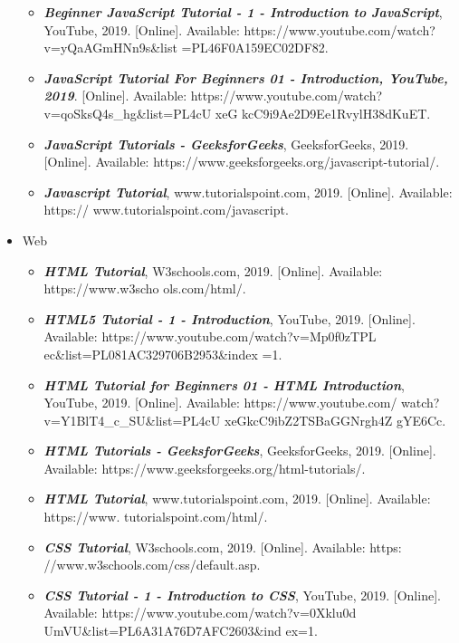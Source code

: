 \documentclass[12pt, a4paper]{report}
\begin{document}
\begin{itemize}
\begin{itemize}
    \item \textit{\textbf{Beginner JavaScript Tutorial - 1 - Introduction to JavaScript}}, YouTube, 2019. [Online]. Available: https://www.youtube.com/watch?v=yQaAGmHNn9s&list =PL46F0A159EC02DF82. 

    \item \textit{\textbf{JavaScript Tutorial For Beginners 01 - Introduction, YouTube, 2019}}. [Online]. Available: https://www.youtube.com/watch?v=qoSksQ4s{\_}hg&list=PL4cU xeG kcC9i9Ae2D9Ee1RvylH38dKuET.

    \item \textit{\textbf{JavaScript Tutorials - GeeksforGeeks}}, GeeksforGeeks, 2019. [Online]. Available: https://www.geeksforgeeks.org/javascript-tutorial/. 

    \item \textit{\textbf{Javascript Tutorial}}, www.tutorialspoint.com, 2019. [Online]. Available: https:// www.tutorialspoint.com/javascript.
    \end{itemize}
    \item Web
        \begin{itemize}
    \item \textit{\textbf{HTML Tutorial}}, W3schools.com, 2019. [Online]. Available: https://www.w3scho ols.com/html/. 
    
    \item \textit{\textbf{HTML5 Tutorial - 1 - Introduction}}, YouTube, 2019. [Online]. Available: https://www.youtube.com/watch?v=Mp0f0zTPL ec&list=PL081AC329706B2953&index =1. 
    
    \item \textit{\textbf{HTML Tutorial for Beginners 01 - HTML Introduction}}, YouTube, 2019. [Online]. Available: https://www.youtube.com/ watch?v=Y1BlT4{\_}c{\_}SU&list=PL4cU xeGkcC9ibZ2TSBaGGNrgh4Z gYE6Cc.
   
    \item \textit{\textbf{HTML Tutorials - GeeksforGeeks}}, GeeksforGeeks, 2019. [Online]. Available: https://www.geeksforgeeks.org/html-tutorials/.

    \item \textit{\textbf{HTML Tutorial}}, www.tutorialspoint.com, 2019. [Online]. Available: https://www. tutorialspoint.com/html/. 

    \item \textit{\textbf{CSS Tutorial}}, W3schools.com, 2019. [Online]. Available: https: //www.w3schools.com/css/default.asp. 

    \item \textit{\textbf{CSS Tutorial - 1 - Introduction to CSS}}, YouTube, 2019. [Online]. Available: https://www.youtube.com/watch?v=0Xklu0d UmVU&list=PL6A31A76D7AFC2603&ind ex=1. 


\end{itemize}
\end{itemize}
\end{document}

